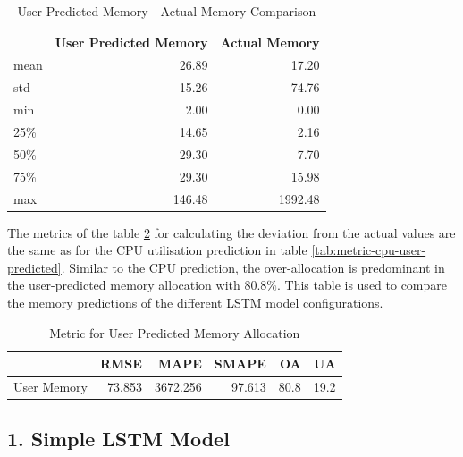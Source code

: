       \begin{table}
        \centering
        \caption{User Predicted Memory - Actual Memory Comparison}
        \label{tab:user-predicted-memory-comparison}
        \begin{tabular}{|l|rr|}
          \toprule
          {} &  User Predicted Memory &  Actual Memory \\
          \midrule
          mean       &          26.89 &    17.20 \\
          std        &          15.26 &    74.76 \\
          min        &           2.00 &     0.00 \\
          25\%        &          14.65 &     2.16 \\
          50\%        &          29.30 &     7.70 \\
          75\%        &          29.30 &    15.98 \\
          max        &         146.48 &  1992.48 \\
          \bottomrule
          \end{tabular}
      \end{table}
      The metrics of the table \ref{tab:metric-mem-user-predicted} for calculating the deviation from the actual values are the same as for the CPU utilisation prediction in table \ref{tab:metric-cpu-user-predicted}.
      Similar to the CPU prediction, the over-allocation is predominant in the user-predicted memory allocation with $80.8\%$.
      This table is used to compare the memory predictions of the different LSTM model configurations. 

      \begin{table}
        \centering
        \caption{Metric for User Predicted Memory Allocation}
        \label{tab:metric-mem-user-predicted}
        \begin{tabular}{|l|rrrrr|}
          \toprule
          {} &    RMSE &     MAPE &   SMAPE &     OA &     UA \\
          \midrule
          User Memory &  73.853 &  3672.256 &  97.613 &  80.8 &  19.2 \\
          \bottomrule
          \end{tabular}
      \end{table}

  \subsection*{1. Simple LSTM Model}
  \label{sec:simple-lstm-model-evaluation-scenarios}
    
